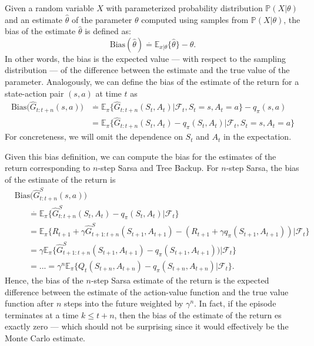 Given a random variable $X$ with parameterized probability distribution $\mathbb{P}(X|\theta)$ and an estimate $\hat{\theta}$ of the parameter $\theta$ computed using samples from $\mathbb{P}(X|\theta)$, the bias of the estimate $\hat{\theta}$ is defined as:
%
\begin{equation*}
    \text{Bias}(\hat{\theta}) \overset{.}{=} \mathbb{E}_{x|\theta}\{ \hat{\theta} \} - \theta.
\end{equation*}
In other words, the bias is the expected value --- with respect to the sampling distribution --- of the difference between the estimate and the true value of the parameter.
Analogously, we can define the bias of the estimate of the return for a state-action pair $(s,a)$ at time $t$ as
\begin{align}
\label{eq:return_bias}
    \text{Bias} \big(\hat{G}_{t:t+n}(s, a) \big) &\overset{.}{=} 
        \mathbb{E}_\pi \{ \hat{G}_{t:t+n}(S_t, A_t) | \mathcal{F}_t, S_t = s, A_t = a \} - q_\pi(s,a) 
        \nonumber \\
    & = \mathbb{E}_\pi \{ \hat{G}_{t:t+n}(S_t, A_t)- q_\pi(S_t, A_t)  | \mathcal{F}_t, S_t = s, A_t = a \} 
\end{align}
For concreteness, we will omit the dependence on $S_t$ and $A_t$ in the expectation.

Given this bias definition, we can compute the bias for the estimates of the return corresponding to $n$-step Sarsa and Tree Backup.
For $n$-step Sarsa, the bias of the estimate of the return is
\begin{align}
\label{eq:sarsa_bias}
    & \text{Bias}\big(  \hat{G}^S_{t:t+n}(s, a)  \big) 
        \nonumber \\
    & \hspace{20pt} \overset{.}{=}
        \mathbb{E}_\pi \{ \hat{G}^S_{t:t+n}(S_t, A_t) - q_\pi (S_t, A_t) | \mathcal{F}_t \} 
        \nonumber \\
    & \hspace{20pt} =
        \mathbb{E}_\pi \{ R_{t+1} + \gamma\hat{G}^S_{t+1:t+n}(S_{t+1}, A_{t+1}) 
        - (R_{t+1} +\gamma q_\pi (S_{t+1}, A_{t+1})) | \mathcal{F}_t \} 
        \nonumber \\
    & \hspace{20pt} =
        \gamma \mathbb{E}_\pi \{ \hat{G}^S_{t+1:t+n}(S_{t+1}, A_{t+1}) 
        -  q_\pi (S_{t+1}, A_{t+1})) | \mathcal{F}_t \} 
        \nonumber \\
    & \hspace{20pt} 
        = ... = \gamma^n \mathbb{E}_\pi \{ Q_t(S_{t+n}, A_{t+n}) - q_\pi (S_{t+n}, A_{t+n}) | \mathcal{F}_t \}.
\end{align}
%
Hence, the bias of the $n$-step Sarsa estimate of the return is the expected difference between the estimate of the action-value function and the true value function after $n$ steps into the future weighted by $\gamma^n$.
In fact, if the episode terminates at a time $k \leq t+n$, then the bias of the estimate of the return es exactly zero --- which should not be surprising since it would effectively be the Monte Carlo estimate.


